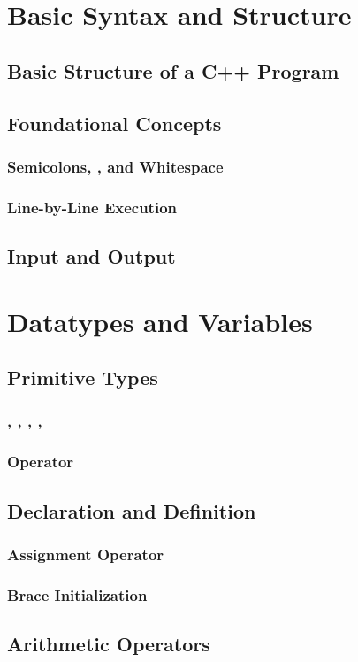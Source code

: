 \documentclass{article}
\begin{document}
\section{Basic Syntax and Structure}

\subsection{Basic Structure of a C++ Program}

\subsubsection{}

\subsection{Foundational Concepts}

\subsubsection{Semicolons, , and Whitespace}

\subsubsection{Line-by-Line Execution}

\subsection{Input and Output}

\section{Datatypes and Variables}

\subsection{Primitive Types}

\subsubsection{, , , , } 

\subsubsection{ Operator}

\subsection{Declaration and Definition}

\subsubsection{Assignment Operator \inlinecpp{=}}

\subsubsection{Brace Initialization \inlinecpp{\{\}}}

\subsection{Arithmetic Operators}
\end{document}
